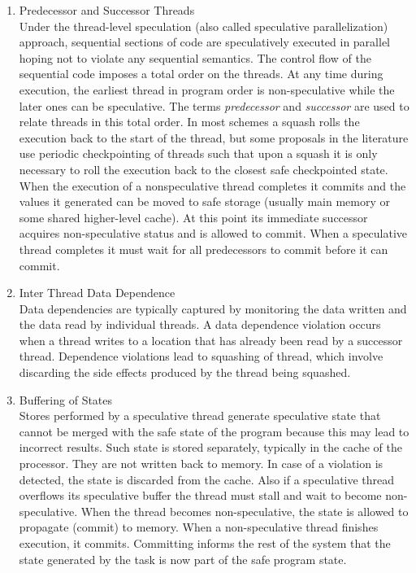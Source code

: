\documentclass[10pt]{report}          %
\begin{document}
 
\begin{enumerate}
 
\item Predecessor and Successor Threads \\

Under the thread-level speculation (also called speculative parallelization) approach, sequential sections of code are speculatively executed in parallel hoping not to violate any sequential semantics.
The control flow of the sequential code imposes a total order on the threads. At any time during execution, the earliest thread in program order is non-speculative while the later ones can be speculative.
The terms \textit{predecessor} and \textit{successor} are used to relate threads in this total order.  In most schemes a squash rolls the execution back to the start of the thread, but some proposals in the literature use periodic checkpointing of threads such that upon a squash it is only necessary to roll the execution back to the closest safe checkpointed state. When the execution of a nonspeculative thread completes it commits and the values it generated can be moved to safe storage (usually main memory or some shared higher-level cache). At this point its immediate successor acquires non-speculative status and is allowed to commit. When a speculative thread completes it must wait for all predecessors to commit before it can commit.


\item Inter Thread Data Dependence \\

Data dependencies are typically captured by monitoring the data written and the data read by individual threads. A data dependence violation occurs when a thread writes to a location that has already been read by a successor thread. Dependence violations lead to squashing of thread, which involve discarding the side effects produced by the thread being squashed.

\item Buffering of States \\

Stores performed by a speculative thread generate speculative state that cannot be merged with the safe state of the program because this may lead to incorrect results. Such state is stored separately, typically in the cache of the processor. They are not written back to memory. In case of a violation is detected, the state is discarded from the cache. Also if a speculative thread overﬂows its speculative buffer the thread must stall and wait to become non-speculative. When the thread becomes non-speculative, the state is allowed to propagate (commit) to memory. When a non-speculative thread finishes execution, it commits. Committing informs the rest of the system that the state generated by the task is now part of the safe program state.



\end{enumerate}
\end{document}
